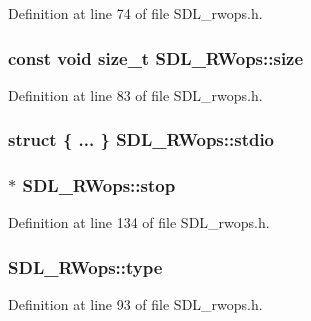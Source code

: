 Definition at line 74 of file S\-D\-L\-\_\-rwops.\-h.

\hypertarget{struct_s_d_l___r_wops_a74d37eb068407bd5cdbdb845e4c4663a}{
\subsubsection[{size}]{\setlength{\rightskip}{0pt plus 5cm}const {\bf void} {\bf size\-\_\-t} S\-D\-L\-\_\-\-R\-Wops\-::size}}\label{struct_s_d_l___r_wops_a74d37eb068407bd5cdbdb845e4c4663a}


Definition at line 83 of file S\-D\-L\-\_\-rwops.\-h.

\hypertarget{struct_s_d_l___r_wops_a644783ed5b6701f6a47942bf2c0795ad}{
\subsubsection[{stdio}]{\setlength{\rightskip}{0pt plus 5cm}struct \{ ... \}   S\-D\-L\-\_\-\-R\-Wops\-::stdio}}\label{struct_s_d_l___r_wops_a644783ed5b6701f6a47942bf2c0795ad}
\hypertarget{struct_s_d_l___r_wops_a4108a41afa8b62e75b0f160de4b56103}{
\subsubsection[{stop}]{$\ast$ S\-D\-L\-\_\-\-R\-Wops\-::stop}}\label{struct_s_d_l___r_wops_a4108a41afa8b62e75b0f160de4b56103}


Definition at line 134 of file S\-D\-L\-\_\-rwops.\-h.

\hypertarget{struct_s_d_l___r_wops_a099017bfceaac24ced0e4d08a4e0a023}{
\subsubsection[{type}]{ S\-D\-L\-\_\-\-R\-Wops\-::type}}\label{struct_s_d_l___r_wops_a099017bfceaac24ced0e4d08a4e0a023}


Definition at line 93 of file S\-D\-L\-\_\-rwops.\-h.

